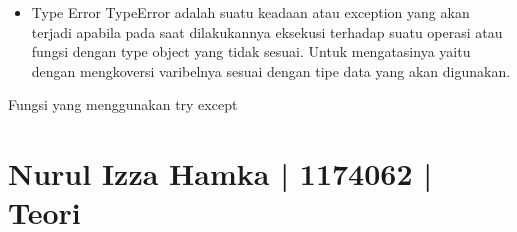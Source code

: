 \begin{enumerate}
\begin{itemize}
\item Type Error
TypeError adalah suatu keadaan atau exception yang akan terjadi apabila pada saat dilakukannya eksekusi terhadap suatu operasi atau fungsi dengan type object yang tidak sesuai. Untuk mengatasinya yaitu dengan mengkoversi varibelnya sesuai dengan tipe data yang akan digunakan.
\end{itemize}

Fungsi yang menggunakan try except


\end{enumerate}


\section{Nurul Izza Hamka | 1174062 | Teori}
